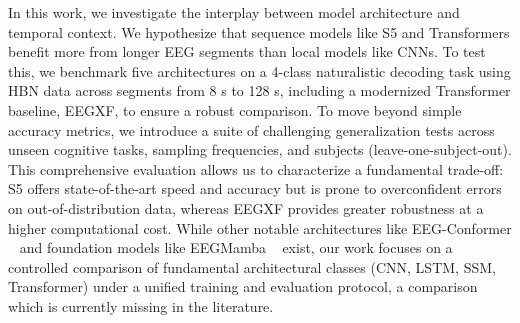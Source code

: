 \documentclass{article}
\newcommand{\eegtrans}{EEGXF}
\begin{document}
In this work, we investigate the interplay between model architecture and temporal context. We hypothesize that sequence models like S5 and Transformers benefit more from longer EEG segments than local models like CNNs. %
To test this, we benchmark five architectures on a 4-class naturalistic decoding task using HBN data across segments from 8 s to 128 s, including a modernized Transformer baseline, \eegtrans{}, to ensure a robust comparison. To move beyond simple accuracy metrics, we introduce a suite of challenging generalization tests across unseen cognitive tasks, sampling frequencies, and subjects (leave-one-subject-out). This comprehensive evaluation allows us to characterize a fundamental trade-off: S5 offers state-of-the-art speed and accuracy but is prone to overconfident errors on out-of-distribution data, whereas \eegtrans{} provides greater robustness at a higher computational cost. While other notable architectures like EEG-Conformer ~\cite{song2023eeg} and foundation models like EEGMamba ~\cite{wang2025eegmamba} exist, our work focuses on a controlled comparison of fundamental architectural classes (CNN, LSTM, SSM, Transformer) under a unified training and evaluation protocol, a comparison which is currently missing in the literature.


\end{document}
